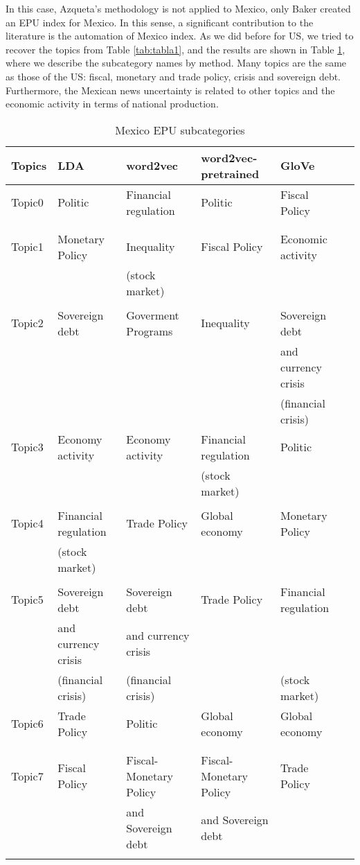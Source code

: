 \documentclass{article}
\begin{document}
In this case, Azqueta's methodology is not applied to Mexico, only Baker created an EPU index for Mexico. In this sense, a significant contribution to the literature is the automation of Mexico index. 
As we did before for US, we tried to recover the topics from Table \ref{tab:tabla1}, and the results are shown in Table  \ref{tab:MX EPU subcategories}, where we describe the subcategory names by method.  Many topics are the same as those of the US: fiscal, monetary and trade policy, crisis and sovereign debt. Furthermore, the Mexican news uncertainty is related to other topics and  the economic activity in terms of national production.  

\begin{table}[H]
\footnotesize
\centering
\begin{tabular}{llllll}
\toprule
   Topics  & LDA &word2vec   & word2vec-pretrained & GloVe   \\
   \midrule
   Topic0 &Politic&Financial
regulation&Politic &Fiscal Policy\\
   &&&&\\
   &&&&\\
   \hline
   Topic1 &Monetary Policy&Inequality&Fiscal Policy&Economic activity\\
    &&(stock market)&&\\
    &&&&\\
    \hline
    Topic2 &Sovereign debt &Goverment Programs&Inequality&Sovereign debt
 \\
    &&&&and currency crisis\\
    &&&&(financial crisis)\\
    \hline
    Topic3 &Economy activity&Economy activity&Financial
regulation&Politic\\
    &&&(stock market)&\\
    &&&&\\
    \hline
    Topic4  &Financial
regulation&Trade Policy&Global economy&Monetary Policy\\
    &(stock market)&&&\\
    &&&& \\
    \hline
    Topic5 &Sovereign debt&Sovereign debt&Trade Policy&Financial
regulation \\
    &and currency crisis&and currency crisis&&\\
    &(financial crisis)&(financial crisis)&&(stock market)\\
    \hline
    Topic6 &Trade Policy&Politic&Global economy&Global economy\\ 
    &&&&\\
    &&&&\\ 
    \hline
    Topic7 &Fiscal Policy&Fiscal-Monetary Policy&Fiscal-Monetary Policy &Trade Policy\\   
    &&and Sovereign debt&and Sovereign debt&\\   
    &&&&\\
\bottomrule
\end{tabular}
  \caption{Mexico EPU subcategories}
\label{tab:MX EPU subcategories}
\end{table}
\end{document}
